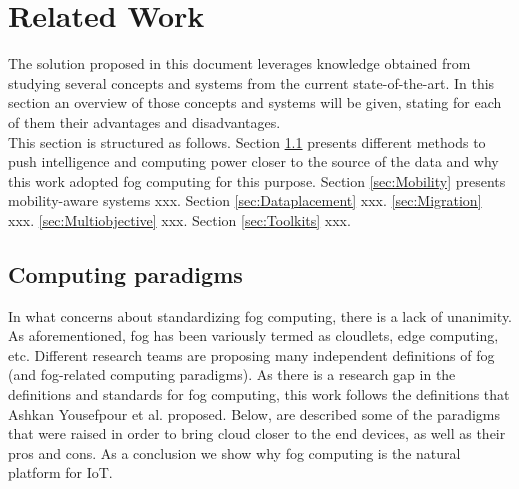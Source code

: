 \vfill
\pagebreak
\section{Related Work}
\label{sec:RelatedWork}

The solution proposed in this document leverages knowledge obtained from
studying several concepts and systems from the current state-of-the-art. In this
section an overview of those concepts and systems will be given, stating for
each of them their advantages and disadvantages.\\
This section is structured as follows. Section \ref{sec:Computingparadigms} presents different methods to push intelligence and computing power closer to the source of the data and why this work adopted fog computing for this purpose. Section \ref{sec:Mobility} presents
mobility-aware systems xxx. Section \ref{sec:Dataplacement} xxx. \ref{sec:Migration} xxx. \ref{sec:Multiobjective} xxx. Section \ref{sec:Toolkits} xxx.

\subsection{Computing paradigms}
\label{sec:Computingparadigms}
In what concerns about standardizing fog computing, there is a lack of unanimity. As aforementioned, fog has been variously termed as cloudlets, edge computing, etc. Different research teams are proposing many independent definitions of fog (and fog-related computing paradigms). As there is a research gap in the definitions and standards for fog computing, this work follows the definitions that Ashkan Yousefpour et al. \cite{yousefpour2018all} proposed. Below, are described some of the paradigms that were raised in order to bring cloud closer to the end devices, as well as their pros and cons. As a conclusion we show why fog computing is the natural platform for IoT.

